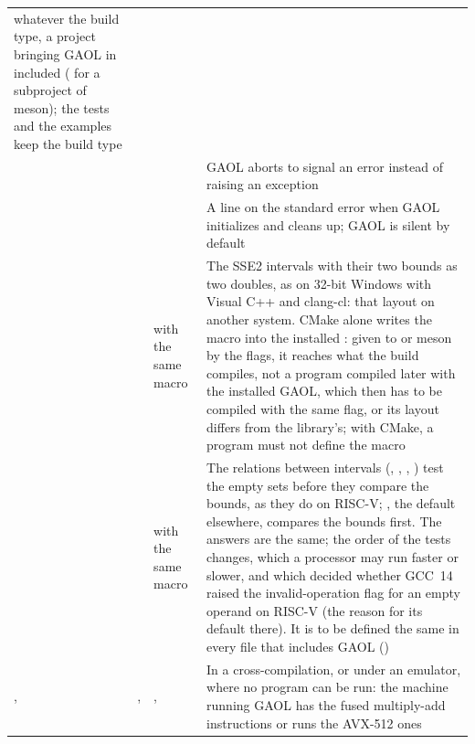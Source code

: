 \begin{longtable}{L{3.5cm}L{3.2cm}L{3.3cm}L{3.8cm}}
    whatever the build type, a project bringing GAOL in included
    ( for a subproject of meson); the tests
    and the examples keep the build type\\
     &
     &  & GAOL
    aborts to signal an error instead of raising an exception\\
     &  &
     & A line on the standard error when
    GAOL initializes and cleans up; GAOL is silent by default\\
     &
     &
     with the same macro & The SSE2 intervals with
    their two bounds as two doubles, as on 32-bit Windows with Visual C++ and
    clang-cl: that layout on another system. CMake alone writes the macro into the
    installed : given to  or
    meson by the flags, it reaches what the build compiles, not a program
    compiled later with the installed GAOL, which then has to be compiled with
    the same flag, or its layout differs from the library's; with CMake, a
    program must not define the macro\\
     &  &  with the same macro & The
    relations between intervals (\code{<}, \code{<=}, \code{>}, \code{>=})
    test the empty sets before they compare the bounds, as they do on
    RISC-V; , the default elsewhere, compares the bounds first. The
    answers are the same; the order of the tests changes, which a
    processor may run faster or slower, and which decided whether GCC~14 raised
    the invalid-operation flag for an empty operand on RISC-V (the reason for
    its default there). It is to be defined the same in every file that
    includes GAOL ()\\
    ,
     &
    ,
     &
    ,  &
    In a cross-compilation, or under an emulator, where no program can be
    run: the machine running GAOL has the fused multiply-add instructions or
    runs the AVX-512 ones\\
\end{longtable}
\endgroup

